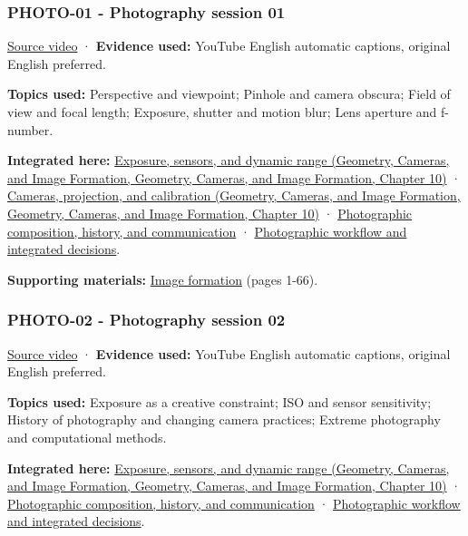 \subsubsection{PHOTO-01 - Photography session 01}\label{04-visual-computing-ii-ch036-photo-01---photography-session-01}

\href{https://www.youtube.com/watch?v=y7HrM-fk_Rc}{Source video} · \textbf{Evidence used:} YouTube English automatic captions, original English preferred.

\textbf{Topics used:} Perspective and viewpoint; Pinhole and camera obscura; Field of view and focal length; Exposure, shutter and motion blur; Lens aperture and f-number.

\textbf{Integrated here:} \href{../03-Geometry-Cameras-and-Image-Formation/main.pdf\#nameddest=03-visual-computing-i-ch003-exposure-sensors-and-dynamic-range}{Exposure, sensors, and dynamic range (Geometry, Cameras, and Image Formation, Geometry, Cameras, and Image Formation, Chapter 10)} · \href{../03-Geometry-Cameras-and-Image-Formation/main.pdf\#nameddest=03-visual-computing-i-ch003-cameras-projection-and-calibration}{Cameras, projection, and calibration (Geometry, Cameras, and Image Formation, Geometry, Cameras, and Image Formation, Chapter 10)} · \hyperref[04-visual-computing-ii-ch034-photographic-composition-history-and-communication]{Photographic composition, history, and communication} · \hyperref[04-visual-computing-ii-ch034-photographic-workflow-and-integrated-decisions]{Photographic workflow and integrated decisions}.

\textbf{Supporting materials:} \href{https://drive.google.com/file/d/0B6w2XfPHEcZYdVd4anZzZTc3aE0/view?usp=sharing}{Image formation} (pages 1-66).

\subsubsection{PHOTO-02 - Photography session 02}\label{04-visual-computing-ii-ch036-photo-02---photography-session-02}

\href{https://www.youtube.com/watch?v=d_sJFslHQsg}{Source video} · \textbf{Evidence used:} YouTube English automatic captions, original English preferred.

\textbf{Topics used:} Exposure as a creative constraint; ISO and sensor sensitivity; History of photography and changing camera practices; Extreme photography and computational methods.

\textbf{Integrated here:} \href{../03-Geometry-Cameras-and-Image-Formation/main.pdf\#nameddest=03-visual-computing-i-ch003-exposure-sensors-and-dynamic-range}{Exposure, sensors, and dynamic range (Geometry, Cameras, and Image Formation, Geometry, Cameras, and Image Formation, Chapter 10)} · \hyperref[04-visual-computing-ii-ch034-photographic-composition-history-and-communication]{Photographic composition, history, and communication} · \hyperref[04-visual-computing-ii-ch034-photographic-workflow-and-integrated-decisions]{Photographic workflow and integrated decisions}.

